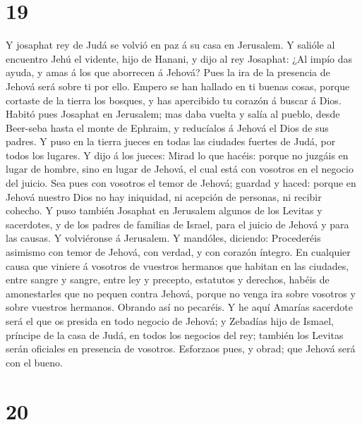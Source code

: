 \hypertarget{section-18}{%
\section{19}\label{section-18}}

 Y josaphat rey de Judá se volvió en paz á su casa en
Jerusalem.  Y salióle al encuentro Jehú el vidente, hijo de
Hanani, y dijo al rey Josaphat: ¿Al impío das ayuda, y amas á los que
aborrecen á Jehová? Pues la ira de la presencia de Jehová será sobre ti
por ello.  Empero se han hallado en ti buenas cosas, porque
cortaste de la tierra los bosques, y has apercibido tu corazón á buscar
á Dios.  Habitó pues Josaphat en Jerusalem; mas daba vuelta
y salía al pueblo, desde Beer-seba hasta el monte de Ephraim, y
reducíalos á Jehová el Dios de sus padres.  Y puso en la
tierra jueces en todas las ciudades fuertes de Judá, por todos los
lugares.  Y dijo á los jueces: Mirad lo que hacéis: porque
no juzgáis en lugar de hombre, sino en lugar de Jehová, el cual está con
vosotros en el negocio del juicio.  Sea pues con vosotros el
temor de Jehová; guardad y haced: porque en Jehová nuestro Dios no hay
iniquidad, ni acepción de personas, ni recibir cohecho.  Y
puso también Josaphat en Jerusalem algunos de los Levitas y sacerdotes,
y de los padres de familias de Israel, para el juicio de Jehová y para
las causas. Y volviéronse á Jerusalem.  Y mandóles,
diciendo: Procederéis asimismo con temor de Jehová, con verdad, y con
corazón íntegro.  En cualquier causa que viniere á vosotros
de vuestros hermanos que habitan en las ciudades, entre sangre y sangre,
entre ley y precepto, estatutos y derechos, habéis de amonestarles que
no pequen contra Jehová, porque no venga ira sobre vosotros y sobre
vuestros hermanos. Obrando así no pecaréis.  Y he aquí
Amarías sacerdote será el que os presida en todo negocio de Jehová; y
Zebadías hijo de Ismael, príncipe de la casa de Judá, en todos los
negocios del rey; también los Levitas serán oficiales en presencia de
vosotros. Esforzaos pues, y obrad; que Jehová será con el bueno.

\hypertarget{section-19}{%
\section{20}\label{section-19}}

